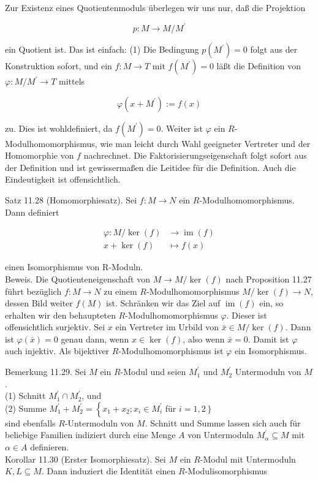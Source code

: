 \documentclass[10pt, letterpaper]{article}
\begin{document}
Zur Existenz eines Quotientenmoduls überlegen wir uns nur, daß die Projektion

$$
p: M \rightarrow M / M^{\prime}
$$

ein Quotient ist. Das ist einfach: (1) Die Bedingung $p\left(M^{\prime}\right)=0$ folgt aus der Konstruktion sofort, und ein $f: M \rightarrow T$ mit $f\left(M^{\prime}\right)=0$ läßt die Definition von $\varphi: M / M^{\prime} \rightarrow T$ mittels

$$
\varphi\left(x+M^{\prime}\right):=f(x)
$$

zu. Dies ist wohldefiniert, da $f\left(M^{\prime}\right)=0$. Weiter ist $\varphi$ ein $R$-Modulhomomorphismus, wie man leicht durch Wahl geeigneter Vertreter und der Homomorphie von $f$ nachrechnet. Die Faktorisierungseigenschaft folgt sofort aus der Definition und ist gewissermaßen die Leitidee für die Definition. Auch die Eindeutigkeit ist offensichtlich.

Satz 11.28 (Homomorphiesatz). Sei $f: M \rightarrow N$ ein $R$-Modulhomomorphismus. Dann definiert

$$
\begin{aligned}
\varphi: M / \operatorname{ker}(f) & \rightarrow \operatorname{im}(f) \\
x+\operatorname{ker}(f) & \mapsto f(x)
\end{aligned}
$$

einen Isomorphismus von R-Moduln.\\
Beweis. Die Quotienteneigenschaft von $M \rightarrow M / \operatorname{ker}(f)$ nach Proposition 11.27 führt bezüglich $f: M \rightarrow N$ zu einem $R$-Modulhomomorphismus $M / \operatorname{ker}(f) \rightarrow N$, dessen Bild weiter $f(M)$ ist. Schränken wir das Ziel auf $\operatorname{im}(f)$ ein, so erhalten wir den behaupteten $R$-Modulhomomorphismus $\varphi$. Dieser ist offensichtlich surjektiv. Sei $x$ ein Vertreter im Urbild von $\bar{x} \in M / \operatorname{ker}(f)$. Dann ist $\varphi(\bar{x})=0$ genau dann, wenn $x \in \operatorname{ker}(f)$, also wenn $\bar{x}=0$. Damit ist $\varphi$ auch injektiv. Als bijektiver $R$-Modulhomomorphismus ist $\varphi$ ein Isomorphismus.

Bemerkung 11.29. Sei $M$ ein $R$-Modul und seien $M_{1}^{\prime}$ und $M_{2}^{\prime}$ Untermoduln von $M$.\\
(1) Schnitt $M_{1}^{\prime} \cap M_{2}^{\prime}$, und\\
(2) Summe $M_{1}^{\prime}+M_{2}^{\prime}=\left\{x_{1}+x_{2} ; x_{i} \in M_{i}^{\prime}\right.$ für $\left.i=1,2\right\}$\\
sind ebenfalls $R$-Untermoduln von $M$. Schnitt und Summe lassen sich auch für beliebige Familien indiziert durch eine Menge $A$ von Untermoduln $M_{\alpha}^{\prime} \subseteq M$ mit $\alpha \in A$ definieren.\\
Korollar 11.30 (Erster Isomorphiesatz). Sei $M$ ein $R$-Modul mit Untermoduln $K, L \subseteq M$. Dann induziert die Identität einen $R$-Modulisomorphismus
\end{document}
